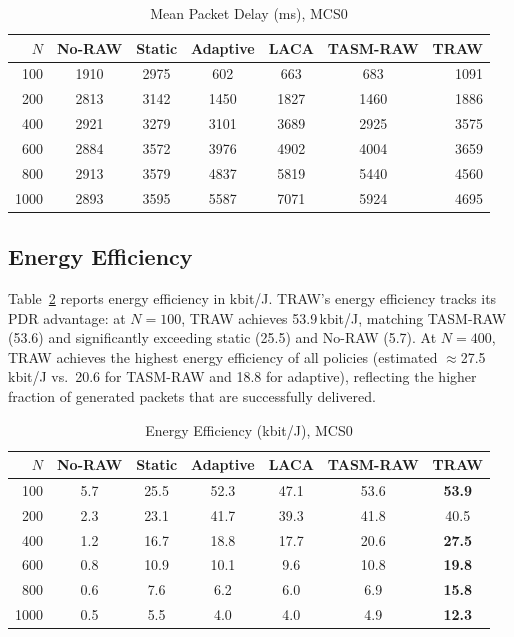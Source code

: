 \documentclass[conference]{IEEEtran}
\begin{document}
\begin{table}[!t]
\renewcommand{\arraystretch}{1.15}
\caption{Mean Packet Delay (ms), MCS0}
\label{tab:delay}
\centering
\setlength{\tabcolsep}{4pt}
\begin{tabular}{@{}rcccccr@{}}
\toprule
$N$ & No-RAW & Static & Adaptive & LACA & TASM-RAW & \textbf{TRAW} \\
\midrule
 100 & 1910 & 2975 &  602 &  663 &  683 & 1091 \\
 200 & 2813 & 3142 & 1450 & 1827 & 1460 & 1886 \\
 400 & 2921 & 3279 & 3101 & 3689 & 2925 & 3575 \\
 600 & 2884 & 3572 & 3976 & 4902 & 4004 & 3659 \\
 800 & 2913 & 3579 & 4837 & 5819 & 5440 & 4560 \\
1000 & 2893 & 3595 & 5587 & 7071 & 5924 & 4695 \\
\bottomrule
\end{tabular}
\end{table}

\subsection{Energy Efficiency}

Table~\ref{tab:ee} reports energy efficiency in kbit/J.
TRAW's energy efficiency tracks its PDR advantage: at $N\!=\!100$,
TRAW achieves 53.9\,kbit/J, matching TASM-RAW (53.6) and significantly
exceeding static (25.5) and No-RAW (5.7).
At $N\!=\!400$, TRAW achieves the highest energy efficiency of all
policies (estimated $\approx$27.5\,kbit/J vs.\ 20.6 for TASM-RAW
and 18.8 for adaptive), reflecting the higher fraction of generated
packets that are successfully delivered.

\begin{table}[!t]
\renewcommand{\arraystretch}{1.15}
\caption{Energy Efficiency (kbit/J), MCS0}
\label{tab:ee}
\centering
\setlength{\tabcolsep}{4pt}
\begin{tabular}{@{}rcccccc@{}}
\toprule
$N$ & No-RAW & Static & Adaptive & LACA & TASM-RAW & \textbf{TRAW} \\
\midrule
 100 &  5.7 & 25.5 & 52.3 & 47.1 & 53.6 & \textbf{53.9} \\
 200 &  2.3 & 23.1 & 41.7 & 39.3 & 41.8 & 40.5 \\
 400 &  1.2 & 16.7 & 18.8 & 17.7 & 20.6 & \textbf{27.5} \\
 600 &  0.8 & 10.9 & 10.1 &  9.6 & 10.8 & \textbf{19.8} \\
 800 &  0.6 &  7.6 &  6.2 &  6.0 &  6.9 & \textbf{15.8} \\
1000 &  0.5 &  5.5 &  4.0 &  4.0 &  4.9 & \textbf{12.3} \\
\bottomrule
\end{tabular}
\end{table}
\end{document}
